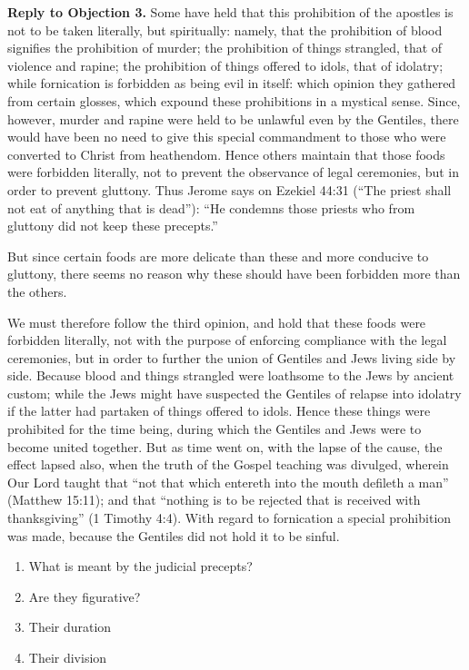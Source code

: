 \textbf{Reply to Objection 3.} Some have held that this prohibition of the apostles is not to be taken literally, but spiritually: namely, that the prohibition of blood signifies the prohibition of murder; the prohibition of things strangled, that of violence and rapine; the prohibition of things offered to idols, that of idolatry; while fornication is forbidden as being evil in itself: which opinion they gathered from certain glosses, which expound these prohibitions in a mystical sense. Since, however, murder and rapine were held to be unlawful even by the Gentiles, there would have been no need to give this special commandment to those who were converted to Christ from heathendom. Hence others maintain that those foods were forbidden literally, not to prevent the observance of legal ceremonies, but in order to prevent gluttony. Thus Jerome says on Ezekiel 44:31 (``The priest shall not eat of anything that is dead''): ``He condemns those priests who from gluttony did not keep these precepts.''

But since certain foods are more delicate than these and more conducive to gluttony, there seems no reason why these should have been forbidden more than the others.

We must therefore follow the third opinion, and hold that these foods were forbidden literally, not with the purpose of enforcing compliance with the legal ceremonies, but in order to further the union of Gentiles and Jews living side by side. Because blood and things strangled were loathsome to the Jews by ancient custom; while the Jews might have suspected the Gentiles of relapse into idolatry if the latter had partaken of things offered to idols. Hence these things were prohibited for the time being, during which the Gentiles and Jews were to become united together. But as time went on, with the lapse of the cause, the effect lapsed also, when the truth of the Gospel teaching was divulged, wherein Our Lord taught that ``not that which entereth into the mouth defileth a man'' (Matthew 15:11); and that ``nothing is to be rejected that is received with thanksgiving'' (1 Timothy 4:4). With regard to fornication a special prohibition was made, because the Gentiles did not hold it to be sinful.


\begin{enumerate}

\item  What is meant by the judicial precepts? 
\item  Are they figurative? 
\item  Their duration 
\item  Their division 
\end{enumerate}


